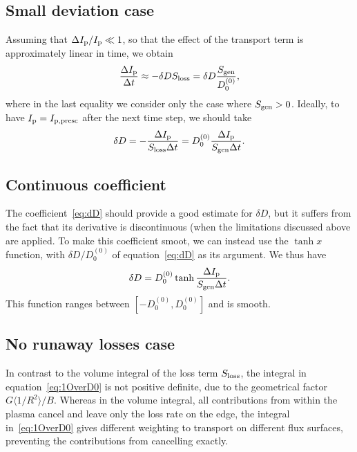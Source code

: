 \documentclass{notes}
\begin{document}
	\subsection{Small deviation case}
	Assuming that $\Delta I_{\rm p}/I_{\rm p}\ll 1$, so that the effect of
	the transport term is approximately linear in time, we obtain
	\begin{equation}\label{eq:dD}
		\frac{\Delta I_{\rm p}}{\Delta t}\approx
			-\delta D S_{\rm loss} = \delta D\frac{S_{\rm gen}}{D_0^{(0)}},
	\end{equation}
	where in the last equality we consider only the case where $S_{\rm gen}>0$.
	Ideally, to have $I_{\rm p} = I_{\rm p,presc}$ after the next time step, we
	should take
	\begin{equation}
		\delta D = -\frac{\Delta I_{\rm p}}{S_{\rm loss}\Delta t} = D_0^{(0)} \frac{\Delta I_{\rm p}}{S_{\rm gen}\Delta t}.
	\end{equation}

	\subsection{Continuous coefficient}
	The coefficient~\eqref{eq:dD} should provide a good estimate for $\delta D$,
	but it suffers from the fact that its derivative is discontinuous (when the
	limitations discussed above are applied. To make this coefficient smoot, we
	can instead use the $\tanh{x}$ function, with $\delta D/D_0^{(0)}$ of
	equation~\eqref{eq:dD} as its argument. We thus have
	\begin{equation}\label{eq:dD_tanh}
		\delta D = D_0^{(0)}\tanh\frac{\Delta I_{\rm p}}{S_{\rm gen}\Delta t}.
	\end{equation}
	This function ranges between $[-D_0^{(0)}, D_0^{(0)}]$ and is smooth.


	\subsection{No runaway losses case}
	In contrast to the volume integral of the loss term $S_{\rm loss}$, the
	integral in equation~\eqref{eq:1OverD0} is not positive definite, due to the
	geometrical factor $G\langle 1/R^2\rangle/B$. Whereas in the volume
	integral, all contributions from within the plasma cancel and leave only the
	loss rate on the edge, the integral in~\eqref{eq:1OverD0} gives different
	weighting to transport on different flux surfaces, preventing the
	contributions from cancelling exactly.
\end{document}
